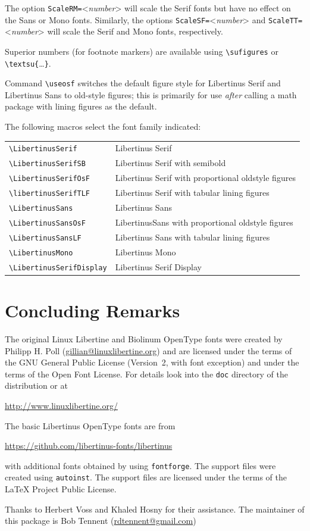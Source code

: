 \documentclass[11pt]{article}
\begin{document}
The option 
\verb|ScaleRM=|<\emph{number}> will scale the Serif fonts but have no effect on the
Sans or Mono fonts. Similarly, the options
\verb|ScaleSF=|<\emph{number}>
and \verb|ScaleTT=|<\emph{number}>
will scale the Serif and Mono fonts, respectively.  

Superior numbers (for footnote markers) are available using \verb|\sufigures|
or \verb|\textsu{|\ldots\verb|}|.


Command \verb|\useosf| switches the default figure style for Libertinus Serif and Libertinus Sans to old-style figures; this is
primarily for use \emph{after} calling a math package 
with lining figures as the default.

The following macros select the font family indicated:
\begin{center}
\begin{tabular}{ll}
\verb|\LibertinusSerif| & Libertinus Serif \\
\verb|\LibertinusSerifSB|& Libertinus Serif with semibold \\
\verb|\LibertinusSerifOsF| & Libertinus Serif with proportional oldstyle figures \\
\verb|\libertinusSerifTLF| & Libertinus Serif with tabular lining figures \\
\verb|\LibertinusSans| & Libertinus Sans \\
\verb|\LibertinusSansOsF|& LibertinusSans with proportional oldstyle figures \\
\verb|\LibertinusSansLF| & Libertinus Sans with tabular lining figures \\
\verb|\LibertinusMono| & Libertinus Mono\\
\verb|\LibertinusSerifDisplay| & Libertinus Serif Display\\
\end{tabular}
\end{center}

\section{Concluding Remarks}


The original Linux Libertine and Biolinum OpenType fonts were created by Philipp H. Poll 
(\url{gillian@linuxlibertine.org}) and are licensed under the terms of the GNU General
Public License (Version~2, with font exception) and under the terms of
the Open Font License. For details look into the \verb|doc| directory of the
distribution or at
\begin{list}{}{}\item
\url{http://www.linuxlibertine.org/}
\end{list}
The basic Libertinus OpenType fonts are from 
\begin{list}{}{}\item
\url{https://github.com/libertinus-fonts/libertinus}
\end{list}
with additional fonts obtained by using \verb|fontforge|.
The support
files were created using \verb|autoinst|. The support files are licensed under
the terms of the LaTeX Project Public License.  

Thanks to Herbert Voss
and Khaled Hosny for their assistance.
The maintainer of this
package is Bob Tennent (\url{rdtennent@gmail.com})
\end{document}

